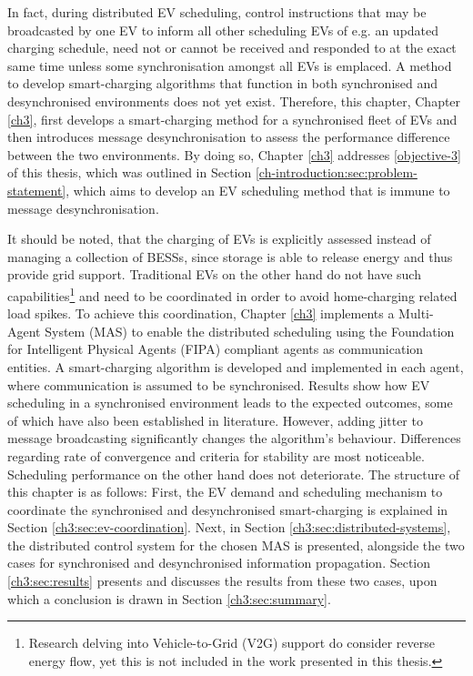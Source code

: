 In fact, during distributed EV scheduling, control instructions that may be broadcasted by one EV to inform all other scheduling EVs of e.g. an updated charging schedule, need not or cannot be received and responded to at the exact same time unless some synchronisation amongst all EVs is emplaced.
A method to develop smart-charging algorithms that function in both synchronised and desynchronised environments does not yet exist.
Therefore, this chapter, Chapter \ref{ch3}, first develops a smart-charging method for a synchronised fleet of EVs and then introduces message desynchronisation to assess the performance difference between the two environments.
By doing so, Chapter \ref{ch3} addresses \ref{objective-3} of this thesis, which was outlined in Section \ref{ch-introduction:sec:problem-statement}, which aims to develop an EV scheduling method that is immune to message desynchronisation.

It should be noted, that the charging of EVs is explicitly assessed instead of managing a collection of BESSs, since storage is able to release energy and thus provide grid support.
Traditional EVs on the other hand do not have such capabilities\footnote{Research delving into Vehicle-to-Grid (V2G) support do consider reverse energy flow, yet this is not included in the work presented in this thesis.} and need to be coordinated in order to avoid home-charging related load spikes.
To achieve this coordination, Chapter \ref{ch3} implements a Multi-Agent System (MAS) to enable the distributed scheduling using the Foundation for Intelligent Physical Agents (FIPA) compliant agents as communication entities.
A smart-charging algorithm is developed and implemented in each agent, where communication is assumed to be synchronised.
Results show how EV scheduling in a synchronised environment leads to the expected outcomes, some of which have also been established in literature.
However, adding jitter to message broadcasting significantly changes the algorithm's behaviour.
Differences regarding rate of convergence and criteria for stability are most noticeable.
Scheduling performance on the other hand does not deteriorate.
The structure of this chapter is as follows:
First, the EV demand and scheduling mechanism to coordinate the synchronised and desynchronised smart-charging is explained in Section \ref{ch3:sec:ev-coordination}.
Next, in Section \ref{ch3:sec:distributed-systems}, the distributed control system for the chosen MAS is presented, alongside the two cases for synchronised and desynchronised information propagation.
Section \ref{ch3:sec:results} presents and discusses the results from these two cases, upon which a conclusion is drawn in Section \ref{ch3:sec:summary}.
